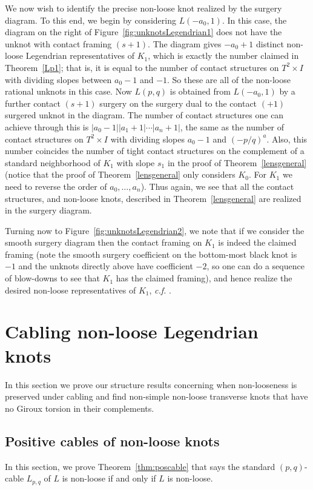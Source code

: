 \documentclass[11pt]{amsart}
\theoremstyle{plain}
\theoremstyle{definition}
\theoremstyle{remark}
\numberwithin{theorem}{section}
\begin{document}
We now wish to identify the precise non-loose knot realized by the surgery diagram. To this end, we begin by considering $L(-a_0,1)$. In this case, the diagram on the right of Figure~\ref{fig:unknotsLegendrian1} does not have the unknot with contact framing $(s+1)$. The diagram gives $-a_0+1$ distinct non-loose Legendrian representatives of $K_1$, which is exactly the number claimed in Theorem~\ref{Lp1}; that is, it is equal to the number of contact structures on $T^2\times I$ with dividing slopes between $a_0-1$ and $-1$. So these are all of the non-loose rational unknots in this case. Now $L(p,q)$ is obtained from $L(-a_0,1)$ by a further contact $(s+1)$ surgery on the surgery dual to the contact $(+1)$ surgered unknot in the diagram. The number of contact structures one can achieve through this is $|a_0-1||a_1+1|\cdots|a_n+1|$, the same as the number of contact structures on $T^2\times I$ with dividing slopes $a_0-1$ and $(-p/q)^a$. Also, this number coincides the number of tight contact structures on the complement of a standard neighborhood of $K_1$ with slope $s_1$ in the proof of Theorem~\ref{lensgeneral} (notice that the proof of Theorem~\ref{lensgeneral} only considers $K_0$. For $K_1$ we need to reverse the order of $a_0, \ldots, a_n$). Thus again, we see that all the contact structures, and non-loose knots, described in Theorem~\ref{lensgeneral} are realized in the surgery diagram. 


Turning now to Figure~\ref{fig:unknotsLegendrian2}, we note that if we consider the smooth surgery diagram then the contact framing on $K_1$ is indeed the claimed framing (note the smooth surgery coefficient on the bottom-most black knot is $-1$ and the unknots directly above have coefficient $-2$, so one can do a sequence of blow-downs to see that $K_1$ has the claimed framing), and hence realize the desired non-loose representatives of $K_1$, {\em c.f.} \cite{EtnyreMinMukherjee22pre}.

\section{Cabling non-loose Legendrian knots}
In this section we prove our structure results concerning when non-looseness is preserved under cabling and find non-simple non-loose transverse knots that have no Giroux torsion in their complements. 
\subsection{Positive cables of non-loose knots}
In this section, we prove Theorem~\ref{thm:poscable} that says the standard $(p,q)$-cable $L_{p,q}$ of $L$ is non-loose if and only if $L$ is non-loose.
\end{document}
